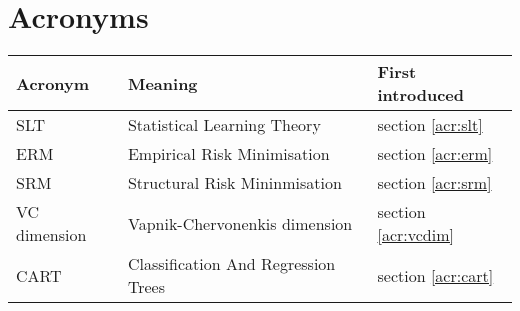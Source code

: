 
\section*{Acronyms}

\begin{tabular}{l l l}

\bf{Acronym} & \bf{Meaning} & \bf{First introduced} \\ \hline \hline

SLT	& Statistical Learning Theory 	& section \ref{acr:slt} \\
ERM	& Empirical Risk Minimisation 	& section \ref{acr:erm} \\
SRM	& Structural Risk Mininmisation & section \ref{acr:srm} \\
VC dimension & Vapnik-Chervonenkis dimension & section \ref{acr:vcdim} \\
CART	& Classification And Regression Trees & section \ref{acr:cart} \\
\hline

\end{tabular}

